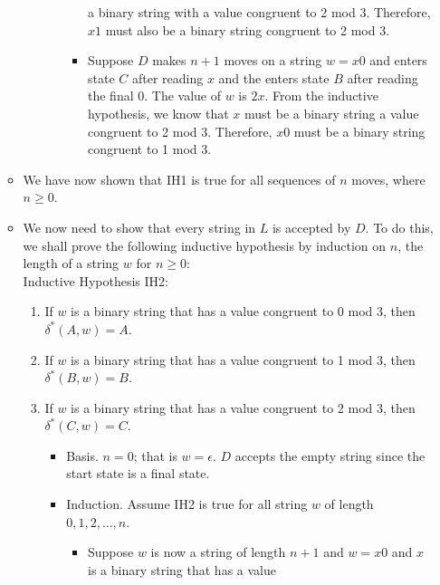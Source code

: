 \documentclass[]{article}
\begin{document}
\begin{enumerate}
\begin{itemize}
\begin{enumerate}
\begin{itemize}
\begin{itemize}
                    a binary string with a value congruent to 2 mod 3. 
                    Therefore, $x1$ must also be a binary string congruent to 2 
                    mod 3.
                    \item Suppose $D$ makes $n + 1$ moves on a string $w = x0$
                    and enters state $C$ after reading $x$ and the enters state 
                    $B$ after reading the final $0$. The value of $w$ is $2x$. 
                    From the inductive hypothesis, we know that $x$ must be a 
                    binary string a value congruent to 2 mod 3. Therefore, $x0$ 
                    must be a binary string congruent to 1 mod 3.
                  \end{itemize}
              \end{itemize}
          \end{enumerate}
        \item We have now shown that IH1 is true for all sequences of $n$ 
        moves, where $n \geq 0$.
        \item We now need to show that every string in $L$ is accepted by $D$. 
        To do this, we shall prove the following inductive hypothesis by 
        induction on $n$, the length of a string $w$ for $n \geq 0$: \\
        Inductive Hypothesis IH2:
          \begin{enumerate}
            \item If $w$ is a binary string that has a value congruent to 0 mod 
            3, then $\delta^*(A,w) = A$. 
            \item If $w$ is a binary string that has a value congruent to 1 mod 
            3, then $\delta^*(B,w) = B$.
            \item If $w$ is a binary string that has a value congruent to 2 mod
            3, then $\delta^*(C,w) = C$.
              \begin{itemize}
                \item Basis. $n = 0$; that is $w = \epsilon$. $D$ accepts the 
                empty string since the start state is a final state.
                \item Induction. Assume IH2 is true for all string $w$ of length 
                $0,1,2,\ldots,n$.
                  \begin{itemize}
                    \item Suppose $w$ is now a string of length $n + 1$ and 
                    $w = x0$ and $x$ is a binary string that has a value 

\end{itemize}
\end{itemize}
\end{enumerate}
\end{itemize}
\end{enumerate}
\end{document}
